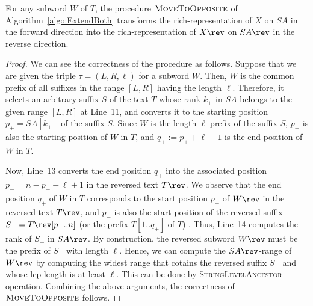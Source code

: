 \begin{algorithm}[t]
\end{algorithm}

\begin{lemma}\label{lem:oper:movetoopposite}
For any subword $W$ of $T$, 
the procedure  $\textsc{MoveToOpposite}$  of Algorithm~\ref{algo:ExtendBoth} transforms
the rich-representation of $X$ on $SA$ in the forward direction into 
the rich-representation of $X\rev$ on $SA\rev$ in the reverse direction. 
\end{lemma}

\begin{proof}
We can see the correctness of the procedure as follows. Suppose that we are given the triple $\tau = (L, R, \ell)$ for a subword $W$. Then, $W$ is the common prefix of all suffixes in the range $[L,R]$ having the length $\ell$. 
Therefore, it selects an arbitrary suffix $S$ of the text $T$ whose rank $k_+$ in $SA$ belongs to the given range $[L,R]$ at Line~11, and converts it to the starting position $p_+ = SA[k_+]$ of the suffix $S$. Since $W$ is the length-$\ell$ prefix of the suffix $S$, $p_+$ is also the starting position of $W$ in $T$, and $q_+ := p_+ + \ell - 1$ is the end position of $W$ in $T$. 

Now, Line~13 converts the end position $q_+$ into the associated position $p_- = n - p_+ - \ell + 1$ in the reversed text $T\rev$. We observe that the end position $q_+$ of $W$ in $T$ corresponds to the start position $p_-$ of $W\rev$ in the reversed text $T\rev$, and $p_-$ is also the start position of the reversed suffix $S_- = T\rev[p_-..n]$ (or the prefix $T[1..q_+]$ of $T$) . 
Thus, Line~14 computes the rank of $S_-$ in $SA\rev$. 
By construction, the reversed subword $W\rev$ must be the prefix of $S_-$ with length $\ell$. Hence, we can compute the $SA\rev$-range of $W\rev$ by computing the widest range that cotains the reversed suffix $S_-$ and whose lcp length is at least $\ell$. This can be done by \textsc{StringLevelAncestor} operation. Combining the above arguments, the correctness of  $\textsc{MoveToOpposite}$ follows. 
\end{proof}

